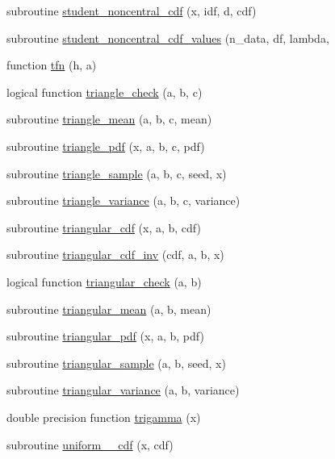 \begin{DoxyCompactItemize}
subroutine \hyperlink{subroutines_8f_a4e75238f2d952890a3b1999e87d07d77}{student\+\_\+noncentral\+\_\+cdf} (x, idf, d, cdf)
\item 
subroutine \hyperlink{subroutines_8f_a7af277756a7246db9ab5286f0a03010a}{student\+\_\+noncentral\+\_\+cdf\+\_\+values} (n\+\_\+data, df, lambda,
\item 
function \hyperlink{subroutines_8f_ab24bd8b58c02c63b5053a52f6fdb8be6}{tfn} (h, a)
\item 
logical function \hyperlink{subroutines_8f_ac17f060df4ddff505ffdf4fd42f83da3}{triangle\+\_\+check} (a, b, c)
\item 
subroutine \hyperlink{subroutines_8f_a3220ee5b701d76c400b43ab093c03f16}{triangle\+\_\+mean} (a, b, c, mean)
\item 
subroutine \hyperlink{subroutines_8f_aae66d0c6853e05e39d4730371449a711}{triangle\+\_\+pdf} (x, a, b, c, pdf)
\item 
subroutine \hyperlink{subroutines_8f_ad37277b4efa293c44cc27fc4bd981e8f}{triangle\+\_\+sample} (a, b, c, seed, x)
\item 
subroutine \hyperlink{subroutines_8f_abc70f31d109699c1245a87ebc99a5736}{triangle\+\_\+variance} (a, b, c, variance)
\item 
subroutine \hyperlink{subroutines_8f_a829742571d36a8b07342c12ea3112f28}{triangular\+\_\+cdf} (x, a, b, cdf)
\item 
subroutine \hyperlink{subroutines_8f_ab66652c0bf9ae711b9b75cd1e6e251c5}{triangular\+\_\+cdf\+\_\+inv} (cdf, a, b, x)
\item 
logical function \hyperlink{subroutines_8f_a1075d4be52d9e73dc2d16c5e4578d58b}{triangular\+\_\+check} (a, b)
\item 
subroutine \hyperlink{subroutines_8f_aab67668dc75a0d2884868176020040bd}{triangular\+\_\+mean} (a, b, mean)
\item 
subroutine \hyperlink{subroutines_8f_a2ff19917924536f55f55531b148a4d60}{triangular\+\_\+pdf} (x, a, b, pdf)
\item 
subroutine \hyperlink{subroutines_8f_aa6b6114d8735ccfa463f60f4b9c08748}{triangular\+\_\+sample} (a, b, seed, x)
\item 
subroutine \hyperlink{subroutines_8f_a8e94727635c279a064a2c497a9175a04}{triangular\+\_\+variance} (a, b, variance)
\item 
double precision function \hyperlink{subroutines_8f_aa287ba105f62a96aee81e3a9f0b0fc6d}{trigamma} (x)
\item 
subroutine \hyperlink{subroutines_8f_a4542d552be72b2153a3e27324241d9b1}{uniform\+\_\+\_\+cdf} (x, cdf)

\end{DoxyCompactItemize}
